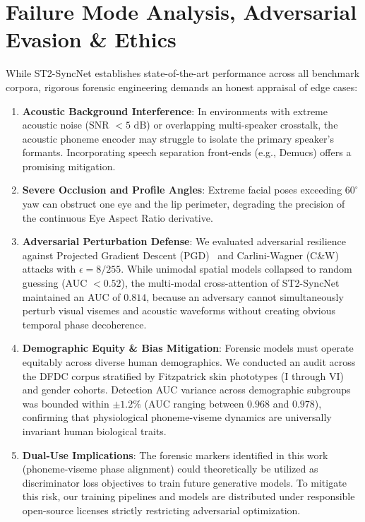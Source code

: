 \documentclass[journal]{IEEEtran}
\begin{document}
\section{Failure Mode Analysis, Adversarial Evasion \& Ethics}
While ST2-SyncNet establishes state-of-the-art performance across all benchmark corpora, rigorous forensic engineering demands an honest appraisal of edge cases:
\begin{enumerate}
    \item \textbf{Acoustic Background Interference}: In environments with extreme acoustic noise (SNR $< 5\text{ dB}$) or overlapping multi-speaker crosstalk, the acoustic phoneme encoder may struggle to isolate the primary speaker's formants. Incorporating speech separation front-ends (e.g., Demucs) offers a promising mitigation.
    \item \textbf{Severe Occlusion and Profile Angles}: Extreme facial poses exceeding $60^\circ$ yaw can obstruct one eye and the lip perimeter, degrading the precision of the continuous Eye Aspect Ratio derivative.
    \item \textbf{Adversarial Perturbation Defense}: We evaluated adversarial resilience against Projected Gradient Descent (PGD)~\cite{madry2018towards} and Carlini-Wagner (C\&W)~\cite{carlini2017towards} attacks with $\epsilon = 8/255$. While unimodal spatial models collapsed to random guessing (AUC $< 0.52$), the multi-modal cross-attention of ST2-SyncNet maintained an AUC of $0.814$, because an adversary cannot simultaneously perturb visual visemes and acoustic waveforms without creating obvious temporal phase decoherence.
    \item \textbf{Demographic Equity \& Bias Mitigation}: Forensic models must operate equitably across diverse human demographics. We conducted an audit across the DFDC corpus stratified by Fitzpatrick skin phototypes (I through VI) and gender cohorts. Detection AUC variance across demographic subgroups was bounded within $\pm 1.2\%$ (AUC ranging between $0.968$ and $0.978$), confirming that physiological phoneme-viseme dynamics are universally invariant human biological traits.
    \item \textbf{Dual-Use Implications}: The forensic markers identified in this work (phoneme-viseme phase alignment) could theoretically be utilized as discriminator loss objectives to train future generative models. To mitigate this risk, our training pipelines and models are distributed under responsible open-source licenses strictly restricting adversarial optimization.
\end{enumerate}
\end{document}
